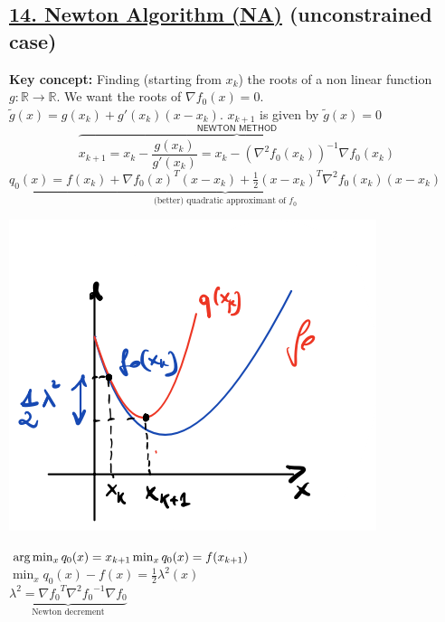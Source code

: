 \documentclass[a4paper]{article}
\begin{document}
\subsection*{\underline{14. Newton Algorithm (NA)} (\textsf{unconstrained case})}   
\vspace{-0.3cm}
\begin{multicols}{2}
    \noindent
    \textbf{Key concept:} Finding (starting from $x_k$) the roots of a non linear function $g:\mathbb{R}\to\mathbb{R}$. We want the roots of $\nabla{f_0(x)}=0$.\\
    $\tilde{g}(x)=g(x_k)+g'(x_k)(x-x_k)$. $x_{k+1}$ is given by $\tilde{g}(x)=0$
    \begin{equation}
        \overbrace{x_{k+1} = x_k - \frac{g(x_k)}{g'(x_k)} = x_k - (\nabla^2{f_0(x_k)})^{-1}\nabla{f_0(x_k)}}^{\textsf{NEWTON METHOD}} \label{eq:NM}
    \end{equation}
    {\small{$\underbrace{q_0(x)\!=\!f(x_k)\!+\!\nabla{f_0(x)}^T\!(x-x_k)\!+\!\frac{1}{2}(x-x_k)^T\nabla^2{f_0(x_k)}\!(x-x_k)}_{\text{(better) quadratic approximant of $f_0$}}$}}
    \raggedcolumns
    \begin{multicols}{2}
        \noindent
        \begin{center}
            \includegraphics[scale=0.35]{img/newton.png}
        \end{center}
        $\arg\min_{x} q_0(x)=x_{k+1}\\
        \min_{x} {q_0(x)}=f(x_{k+1})$\\
     $\min_{x}{q_0(x)}-f(x)=\frac{1}{2}\lambda^2(x)$\\ 
     $\underbrace{\lambda^2=\nabla{f_0}^T\nabla^2{f_0}^{-1}\nabla{f_0}}_{\text{Newton decrement}}$\\

\end{multicols}
\end{multicols}
\end{document}
